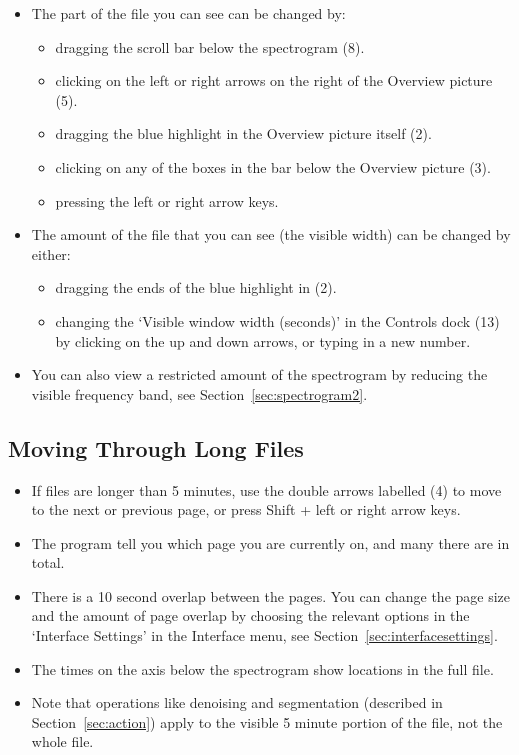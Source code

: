 \documentclass{article}
\begin{document}
\begin{itemize}
\item The part of the file you can see can be changed by:
	\begin{itemize}
	\item dragging the scroll bar below the spectrogram (8).
	\item clicking on the left or right arrows on the right of the Overview picture (5).
	\item dragging the blue highlight in the Overview picture itself (2). 
	\item clicking on any of the boxes in the bar below the Overview picture (3).
	\item pressing the left or right arrow keys.
	\end{itemize}
	
\item The amount of the file that you can see (the visible width) can be changed by either: 
	\begin{itemize}
	\item dragging the ends of the blue highlight in (2).
	\item changing the `Visible window width (seconds)' in the Controls dock (13) by clicking on the up and down arrows, or typing in a new number.
	\end{itemize}

\item You can also view a restricted amount of the spectrogram by reducing the visible frequency band, see Section~\ref{sec:spectrogram2}. 
\end{itemize}

\subsection{Moving Through Long Files}

\begin{itemize}
\item If files are longer than 5 minutes, use the double arrows labelled (4) to move to the next or previous page, or press Shift + left or right arrow keys. 
\item The program tell you which page you are currently on, and many there are in total. 
\item There is a 10 second overlap between the pages. You can change the page size and the amount of page overlap by choosing the relevant options in the `Interface Settings' in the Interface menu, see Section~\ref{sec:interfacesettings}. 
\item The times on the axis below the spectrogram show locations in the full file.
\item Note that operations like denoising and segmentation (described in Section~\ref{sec:action}) apply to the visible 5 minute portion of the file, not the whole file.
\end{itemize}
\end{document}
